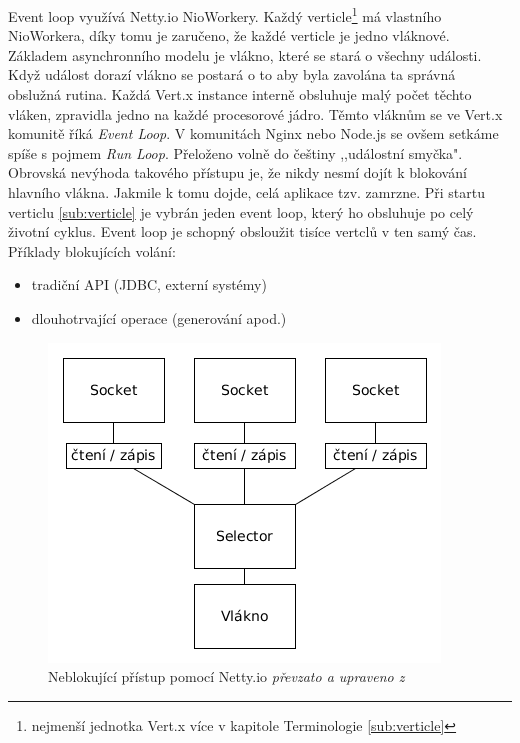 Event loop využívá Netty.io NioWorkery. Každý verticle\footnote{nejmenší jednotka Vert.x více v kapitole Terminologie \ref{sub:verticle}} má vlastního NioWorkera, díky tomu je zaručeno, že každé verticle je jedno vláknové. Základem asynchronního modelu je vlákno, které se stará o všechny události. Když událost dorazí vlákno se postará o to aby byla zavolána ta správná obslužná rutina. Každá Vert.x instance interně obsluhuje malý počet těchto vláken, zpravidla jedno na každé procesorové jádro. Těmto vláknům se ve Vert.x komunitě říká \emph{Event Loop}. V komunitách Nginx nebo Node.js se ovšem setkáme spíše s pojmem \emph{Run Loop}. Přeloženo volně do češtiny ,,událostní smyčka". Obrovská nevýhoda takového přístupu je, že nikdy nesmí dojít k blokování hlavního vlákna. Jakmile k tomu dojde, celá aplikace tzv. zamrzne. Při startu verticlu \ref{sub:verticle} je vybrán jeden event loop, který ho obsluhuje po celý životní cyklus. Event loop je schopný obsloužit tisíce vertclů v ten samý čas. Příklady blokujících volání:
\begin{itemize}
\item{tradiční API (JDBC, externí systémy)}
\item{dlouhotrvající operace (generování apod.)}
\end{itemize}

\begin{figure}
\begin{centering}
\includegraphics[scale=0.55]{obrazky/vertx_pattern}
\par\end{centering}
\caption{Neblokující přístup pomocí Netty.io \emph{převzato a upraveno z \cite{nettyInAction}}\label{fig:vertx_pattern}}
\end{figure}

